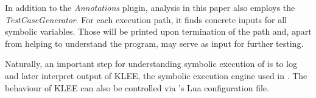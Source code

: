 
\bigskip

In addition to the \textit{Annotations} plugin, analysis in this paper also employs the \textit{TestCaseGenerator}.
For each execution path, it finds concrete inputs for all symbolic variables.
Those will be printed upon termination of the path and, apart from helping to understand the program, may serve as input for further testing.

\bigskip

Naturally, an important step for understanding symbolic execution of \app is to log and later interpret output of KLEE, the symbolic execution engine used in \sse.
The behaviour of KLEE can also be controlled via \sse's Lua configuration file.



\iffalse
§5 	Implementation (of the test case using S2E)
		> Vorgehen
		> Verwendete Konsistenzmodelle
		> Arbeitsweise von Selektoren/Analysatoren
\fi